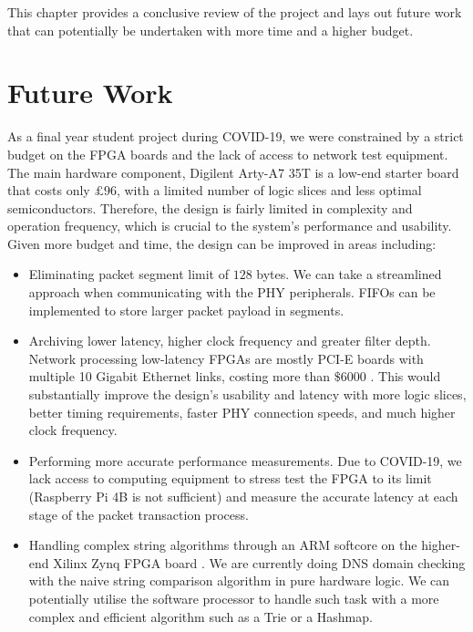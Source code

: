 \documentclass[a4paper]{report}
\begin{document}
This chapter provides a conclusive review of the project and lays out future work that can potentially be undertaken with more time and a higher budget.

\section{Future Work}

As a final year student project during COVID-19, we were constrained by a strict budget on the FPGA boards and the lack of access to network test equipment. The main hardware component, Digilent Arty-A7 35T is a low-end starter board that costs only $£96$, with a limited number of logic slices and less optimal semiconductors. Therefore, the design is fairly limited in complexity and operation frequency, which is crucial to the system's performance and usability. Given more budget and time, the design can be improved in areas including:

\begin{itemize}
    \item Eliminating packet segment limit of $128$ bytes. We can take a streamlined approach when communicating with the PHY peripherals. FIFOs can be implemented to store larger packet payload in segments.
    \item Archiving lower latency, higher clock frequency and greater filter depth. Network processing low-latency FPGAs are mostly PCI-E boards with multiple 10 Gigabit Ethernet links, costing more than $\$6000$ \cite{netfpga-sume-digilent}. This would substantially improve the design's usability and latency with more logic slices, better timing requirements, faster PHY connection speeds, and much higher clock frequency.
    \item Performing more accurate performance measurements. Due to COVID-19, we lack access to computing equipment to stress test the FPGA to its limit (Raspberry Pi 4B is not sufficient) and measure the accurate latency at each stage of the packet transaction process.
    \item Handling complex string algorithms through an ARM softcore on the higher-end Xilinx Zynq FPGA board \cite{zynq-7000-xilinx}. We are currently doing DNS domain checking with the naive string comparison algorithm in pure hardware logic. We can potentially utilise the software processor to handle such task with a more complex and efficient algorithm such as a Trie or a Hashmap.
\end{itemize}
\end{document}
